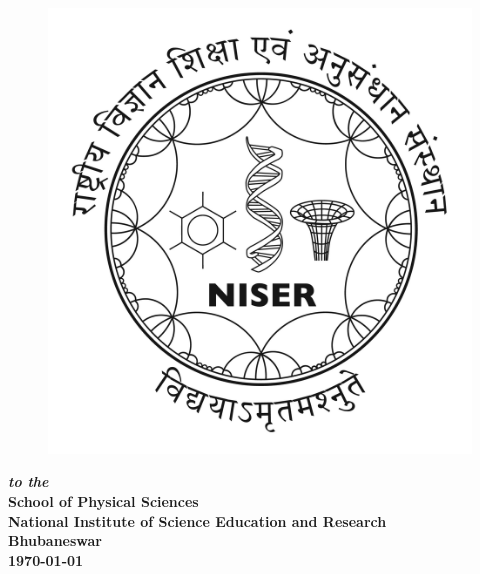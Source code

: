 \begin{changemargin}{0cm}{0cm}
\vfill
\begin{center}
\begin{figure}[h!]
\centering
\includegraphics[scale=0.2]{logo1.jpg}
\end{figure}
 {\bf {\em to the }} \\
{\bf {\large School of Physical Sciences}} \\
{\bf {\large National Institute of Science Education and Research}} \\
{\bf Bhubaneswar} \\
{\bf \today} 
\end{center}
\end{changemargin}


